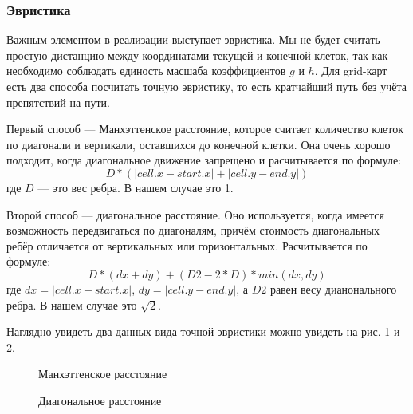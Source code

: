 \subsubsection{Эвристика}
Важным элементом в реализации выступает эвристика. Мы не будет считать простую дистанцию между координатами текущей и конечной клеток, так как необходимо соблюдать единость масшаба коэффициентов $g$ и $h$. Для grid-карт есть два способа посчитать точную эвристику, то есть кратчайший путь без учёта препятствий на пути.

Первый способ — Манхэттенское расстояние, которое считает количество клеток по диагонали и вертикали, оставшихся до конечной клетки. Она очень хорошо подходит, когда диагональное движение запрещено и расчитывается по формуле:
$$
D * (|cell.x - start.x|+|cell.y-end.y|)
$$ где $D$ — это вес ребра. В нашем случае это 1.

Второй способ — диагональное расстояние. Оно используется, когда имеется возможность передвигаться по диагоналям, причём стоимость диагональных ребёр отличается от вертикальных или горизонтальных. Расчитывается по формуле:
$$
D * (dx + dy) + (D2 - 2 * D) * min(dx, dy)
$$ где $dx=|cell.x - start.x|$, $dy=|cell.y-end.y|$, а $D2$ равен весу дианонального ребра. В нашем случае это $\sqrt{2}$.

Наглядно увидеть два данных вида точной эвристики можно увидеть на рис. \ref{manh} и \ref{diag}.

\begin{figure}[h]
\caption{Манхэттенское расстояние}
\label{manh}
\end{figure}

\begin{figure}[h]
\caption{Диагональное расстояние}
\label{diag}
\end{figure}

